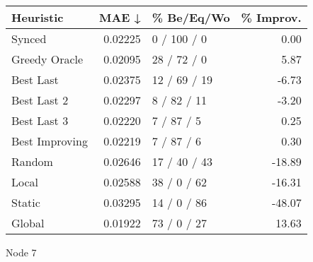 \begin{tabular}{lrlr}
\toprule
\textbf{Heuristic} & \textbf{MAE ↓} & \textbf{\% Be/Eq/Wo} & \textbf{\% Improv.} \\
\midrule
            Synced &        0.02225 &          0 / 100 / 0 &                0.00 \\
     Greedy Oracle &        0.02095 &          28 / 72 / 0 &                5.87 \\
         Best Last &        0.02375 &         12 / 69 / 19 &               -6.73 \\
       Best Last 2 &        0.02297 &          8 / 82 / 11 &               -3.20 \\
       Best Last 3 &        0.02220 &           7 / 87 / 5 &                0.25 \\
    Best Improving &        0.02219 &           7 / 87 / 6 &                0.30 \\
            Random &        0.02646 &         17 / 40 / 43 &              -18.89 \\
             Local &        0.02588 &          38 / 0 / 62 &              -16.31 \\
            Static &        0.03295 &          14 / 0 / 86 &              -48.07 \\
            Global &        0.01922 &          73 / 0 / 27 &               13.63 \\
\bottomrule
\end{tabular}
\caption{Node 7}
\label{tab:non_lr05_le1_bs2_7}
